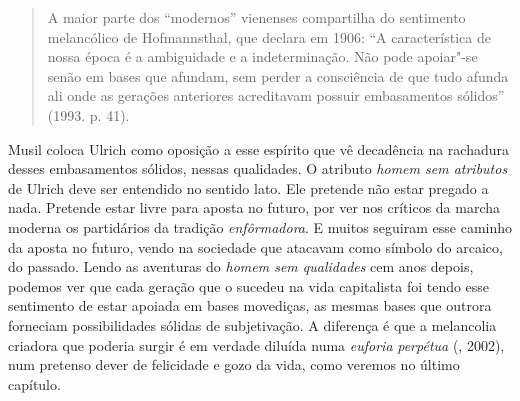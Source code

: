 \begin{quote}
A maior parte dos ``modernos'' vienenses compartilha do sentimento
melancólico de Hofmannsthal, que declara em 1906: ``A característica de
nossa época é a ambiguidade e a indeterminação. Não pode apoiar"-se senão
em bases que afundam, sem perder a consciência de que tudo afunda ali
onde as gerações anteriores acreditavam possuir embasamentos sólidos''
(1993. p. 41).
\end{quote}

Musil coloca Ulrich como oposição a esse espírito que vê decadência na
rachadura desses embasamentos sólidos, nessas qualidades. O atributo
\emph{homem sem atributos} de Ulrich deve ser entendido no sentido lato.
Ele pretende não estar pregado a nada. Pretende estar livre para aposta
no futuro, por ver nos críticos da marcha moderna os partidários da
tradição \emph{enfôrmadora}. E muitos seguiram esse caminho da aposta no
futuro, vendo na sociedade que atacavam como símbolo do arcaico, do
passado. Lendo as aventuras do \emph{homem sem qualidades} cem anos
depois, podemos ver que cada geração que o sucedeu na vida capitalista
foi tendo esse sentimento de estar apoiada em bases movediças, as mesmas
bases que outrora forneciam possibilidades sólidas de subjetivação. A
diferença é que a melancolia criadora que poderia surgir é em verdade
diluída numa \emph{euforia} \emph{perpétua} (, 2002), num
pretenso dever de felicidade e gozo da vida, como veremos no último
capítulo.

